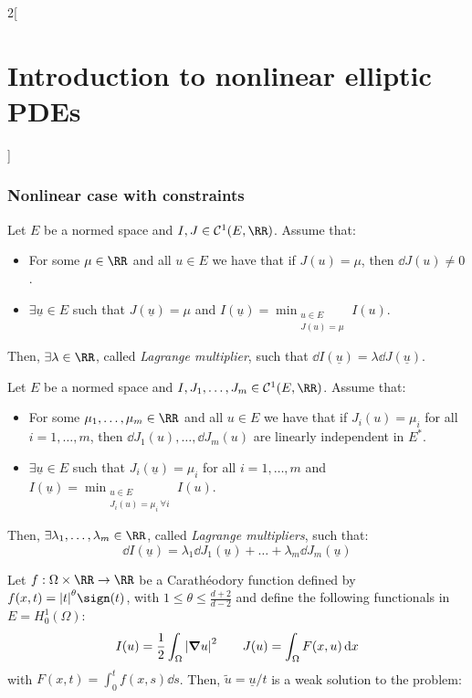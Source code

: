 \documentclass[../../../main_math.tex]{subfiles}
\begin{document}
\begin{multicols}{2}[\section{Introduction to nonlinear elliptic PDEs}]
  \subsubsection{Nonlinear case with constraints}
  \begin{theorem}
    Let $E$ be a normed space and $I,J\in \mathcal{C}^1(E,\RR)$. Assume that:
    \begin{itemize}
      \item For some $\mu\in\RR$ and all $u\in E$ we have that if $J(u)=\mu$, then $\dd{J(u)}\ne0$.
      \item $\exists \underline{u}\in E$ such that $J(\underline{u})=\mu$ and $I(\underline{u})=\displaystyle \min_{\substack{u\in E \\ J(u)=\mu}}I(u)$.
    \end{itemize}
    Then, $\exists \lambda\in\RR$, called \emph{Lagrange multiplier}, such that $\dd{I(\underline{u})}=\lambda \dd{J(\underline{u})}$.
  \end{theorem}
  \begin{theorem}
    Let $E$ be a normed space and $I,J_1,\dots,J_m\in \mathcal{C}^1(E,\RR)$. Assume that:
    \begin{itemize}
      \item For some $\mu_1,\dots,\mu_m\in\RR$ and all $u\in E$ we have that if $J_i(u)=\mu_i$ for all $i=1,\dots,m$, then $\dd{J_1(u)}, \ldots, \dd{J_m(u)}$ are linearly independent in $E^*$.
      \item $\exists \underline{u}\in E$ such that $J_i(\underline{u})=\mu_i$ for all $i=1,\dots,m$ and $I(\underline{u})=\displaystyle \min_{\substack{u\in E \\ J_i(u)=\mu_i\  \forall i}}I(u)$.
    \end{itemize}
    Then, $\exists \lambda_1,\dots,\lambda_m\in\RR$, called \emph{Lagrange multipliers}, such that: $$\dd{I(\underline{u})}=\lambda_1 \dd{J_1(\underline{u})}+\dots+\lambda_m \dd{J_m(\underline{u})}$$
  \end{theorem}
  \begin{proposition}[Aplication]\label{INEPDE:lagrange_apl}
    Let $f:\Omega\times \RR\to\RR$ be a Carathéodory function defined by $f(x,t)=\abs{t}^{\theta}\sign(t)$, with $1\leq \theta\leq \frac{d+2}{d-2}$
    and define the following functionals in $E=H_0^1(\Omega)$:
    $$
      I(u)=\frac{1}{2}\int_\Omega \abs{\grad u}^2\qquad J(u)=\int_\Omega F(x,u)\dd{x}
    $$
    with $F(x,t)=\int_0^t f(x,s)\dd{s}$. Then, $\tilde{u}=\underline{u}/t$ is a weak solution to the problem:

\end{proposition}
\end{multicols}
\end{document}
